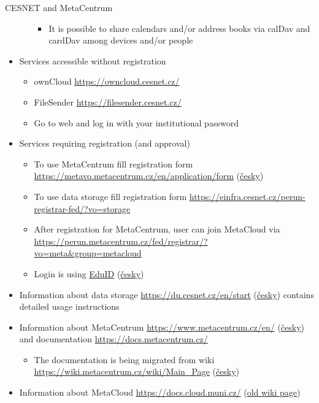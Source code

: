 \documentclass[compress, xelatex, 11pt, xcolor=svgnames, aspectratio=169,
	hyperref={
		bookmarks=true,
		unicode=true,
		colorlinks=true,
		pdftitle={Linux, command line and MetaCentrum},
		plainpages=false,
		pdfauthor={Vojtech Zeisek},
		pdfsubject={Course about use of Linux command line, writing shell scripts and using MetaCentrum of CESNET},
		pdfcreator={XeLaTeX},
		pdfkeywords={Linux, GNU, BASH, shell, command line, MetaCentrum},
		linkcolor=DarkRed, %
		anchorcolor=DarkBlue, %
		citecolor=Indigo, %
		filecolor=NavyBlue, %
		menucolor=DarkMagenta, %
		urlcolor=DarkBlue, %
		},
	url={hyphens, lowtilde} %
	]{beamer}
\begin{document}
\begin{frame}[allowframebreaks]{CESNET and MetaCentrum}
\begin{itemize}
\begin{itemize}
\begin{itemize}
				\item It is possible to share calendars and/or address books via calDav and cardDav among devices and/or people
			\end{itemize}
		\end{itemize}
		\item Services accessible without registration
		\begin{itemize}
			\item ownCloud \url{https://owncloud.cesnet.cz/}
			\item FileSender \url{https://filesender.cesnet.cz/}
			\item Go to web and log in with your institutional password
		\end{itemize}
		\item Services requiring registration (and approval)
		\begin{itemize}
			\item To use MetaCentrum fill registration form \url{https://metavo.metacentrum.cz/en/application/form} (\href{https://metavo.metacentrum.cz/cs/application/}{česky})
			\item To use data storage fill registration form \url{https://einfra.cesnet.cz/perun-registrar-fed/?vo=storage}
			\item After registration for MetaCentrum, user can join MetaCloud via \url{https://perun.metacentrum.cz/fed/registrar/?vo=meta&group=metacloud}
			\item Login is using \href{https://www.eduid.cz/en/index}{EduID} (\href{https://www.eduid.cz/cs/index}{česky})
		\end{itemize}
		\item Information about data storage \url{https://du.cesnet.cz/en/start} (\href{https://du.cesnet.cz/cs/start}{česky}) contains detailed usage instructions
		\item Information about MetaCentrum \url{https://www.metacentrum.cz/en/} (\href{https://www.metacentrum.cz/cs/}{česky}) and documentation \url{https://docs.metacentrum.cz/}
		\begin{itemize}
			\item The documentation is being migrated from wiki \url{https://wiki.metacentrum.cz/wiki/Main_Page} (\href{https://wiki.metacentrum.cz/wiki/Hlavn\%C3\%AD_strana}{česky})
		\end{itemize}
		\item Information about MetaCloud \url{https://docs.cloud.muni.cz/} (\href{https://wiki.metacentrum.cz/wiki/Kategorie:Clouds}{old wiki page})

\end{itemize}
\end{frame}
\end{document}
